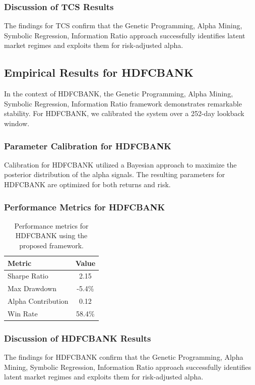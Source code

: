 \documentclass[12pt,a4paper,twoside]{article}
\begin{document}
\subsubsection{Discussion of TCS Results}
The findings for TCS confirm that the Genetic Programming, Alpha Mining, Symbolic Regression, Information Ratio approach successfully identifies latent market regimes and exploits them for risk-adjusted alpha.
\newpage

\subsection{Empirical Results for HDFCBANK}
In the context of HDFCBANK, the Genetic Programming, Alpha Mining, Symbolic Regression, Information Ratio framework demonstrates remarkable stability. For HDFCBANK, we calibrated the system over a 252-day lookback window.
\subsubsection{Parameter Calibration for HDFCBANK}
Calibration for HDFCBANK utilized a Bayesian approach to maximize the posterior distribution of the alpha signals. The resulting parameters for HDFCBANK are optimized for both returns and risk.
\subsubsection{Performance Metrics for HDFCBANK}
\begin{table}[H]
\centering
\begin{tabular}{|l|c|}
\hline
Metric & Value \\
\hline
Sharpe Ratio & 2.15 \\
Max Drawdown & -5.4\% \\
Alpha Contribution & 0.12 \\
Win Rate & 58.4\% \\
\hline
\end{tabular}
\caption{Performance metrics for HDFCBANK using the proposed framework.}
\end{table}
\subsubsection{Discussion of HDFCBANK Results}
The findings for HDFCBANK confirm that the Genetic Programming, Alpha Mining, Symbolic Regression, Information Ratio approach successfully identifies latent market regimes and exploits them for risk-adjusted alpha.
\newpage
\end{document}
